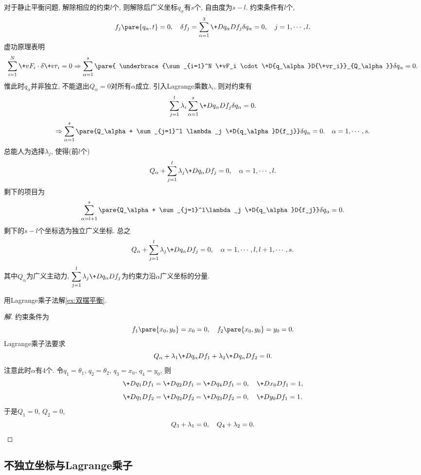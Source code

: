 \documentclass[../LectureNotes.tex]{subfiles}
\begin{document}
对于静止平衡问题, 解除相应的约束$l$个, 则解除后广义坐标$q_\alpha$有$s$个, 自由度为$s-l$. 约束条件有$l$个,
\[ f_j\pare{q_\alpha, t} = 0,\quad \delta f_j = \sum_{\alpha=1}^3 \+D{q_\alpha}D{f_j}\delta q_\alpha = 0,\quad j = 1,\cdots, l. \]
虚功原理表明
\[ \sum_{i=1}^N \+vF_i\cdot\delta\+vr_i = 0\Rightarrow \sum_{\alpha=1}^s\pare{ \underbrace{\sum_{i=1}^N \+vF_i \cdot \+D{q_\alpha}D{\+vr_i}}_{Q_\alpha}}\delta q_\alpha = 0. \]
惟此时$q_\alpha$并非独立, 不能退出$Q_\alpha = 0$对所有$\alpha$成立. 引入Lagrange乘数$\lambda_i$, 则对约束有
\[ \sum_{j=1}^l \lambda_i \sum_{\alpha=1}^s \+D{q_\alpha}D{f_j} \delta q_\alpha = 0. \]
\[ \Rightarrow \sum_{\alpha=1}^s \pare{Q_\alpha + \sum_{j=1}^l \lambda_j \+D{q_\alpha}D{f_j}}\delta q_\alpha = 0. \quad \alpha = 1,\cdots, s. \]
总能人为选择$\lambda_j$, 使得(前$l$个)
\[ Q_\alpha + \sum_{j=1}^l \lambda_j \+D{q_\alpha}D{f_j} = 0,\quad \alpha = 1,\cdots, l. \]
剩下的项目为
\[ \sum_{\alpha = l+1}^s \pare{Q_\alpha + \sum_{j=1}^l\lambda_j \+D{q_\alpha}D{f_j}} \delta q_\alpha = 0. \]
剩下的$s-l$个坐标选为独立广义坐标. 总之
\[ Q_\alpha + \sum_{j=1}^l \lambda_j \+D{q_\alpha}D{f_j} = 0,\quad \alpha = 1,\cdots,l,l+1,\cdots, s. \]
其中$Q_\alpha$为广义主动力, $\displaystyle \sum_{j=1}^l \lambda_j \+D{q_\alpha}D{f_j}$为约束力沿$\alpha$广义坐标的分量.
\begin{sample}
    \begin{ex}
        用Lagrange乘子法解\cref{ex:双摆平衡}.
    \end{ex}
    \begin{proof}[解]
        约束条件为
        \[ f_1\pare{x_0, y_0} = x_0 = 0,\quad f_2\pare{x_0,y_0} = y_0 = 0. \]
        Lagrange乘子法要求
        \[ Q_\alpha + \lambda_1 \+D{q_\alpha}D{f_1} + \lambda_2 \+D{q_\alpha}D{f_2} = 0. \]
        注意此时$\alpha$有$4$个. 令$q_1 = \theta_1$, $q_2 = \theta_2$, $q_3 = x_0$, $q_4 = y_0$, 则
        \[ \+D{q_1}D{f_1} = \+D{q_2}D{f_1} = \+D{q_4}D{f_1} = 0,\quad \+D{x_0}D{f_1} = 1, \]
        \[ \+D{q_1}D{f_2} = \+D{q_2}D{f_2} = \+D{q_3}D{f_2} = 0,\quad \+D{y_0}D{f_1} = 1. \]
        于是$Q_1 = 0$, $Q_2 = 0$,
        \[ Q_3 + \lambda_1 = 0,\quad Q_4 + \lambda_2 = 0.\qedhere \]
    \end{proof}
\end{sample}




\subsection{不独立坐标与Lagrange乘子} %
\label{sub:不独立坐标与lagrange乘子}
\end{document}
